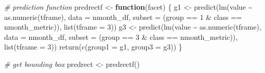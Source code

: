 \documentclass[
]{article}
\newenvironment{Shaded}{\begin{snugshade}}{\end{snugshade}}
\newcommand{\AttributeTok}[1]{\textcolor[rgb]{0.77,0.63,0.00}{#1}}
\newcommand{\CommentTok}[1]{\textcolor[rgb]{0.56,0.35,0.01}{\textit{#1}}}
\newcommand{\ControlFlowTok}[1]{\textcolor[rgb]{0.13,0.29,0.53}{\textbf{#1}}}
\newcommand{\DecValTok}[1]{\textcolor[rgb]{0.00,0.00,0.81}{#1}}
\newcommand{\FunctionTok}[1]{\textcolor[rgb]{0.00,0.00,0.00}{#1}}
\newcommand{\NormalTok}[1]{#1}
\newcommand{\OtherTok}[1]{\textcolor[rgb]{0.56,0.35,0.01}{#1}}
\newcommand{\SpecialCharTok}[1]{\textcolor[rgb]{0.00,0.00,0.00}{#1}}
\begin{document}
\begin{Shaded}
\begin{Highlighting}[]
\CommentTok{\# prediction function}
\NormalTok{predrectf }\OtherTok{\textless{}{-}} \ControlFlowTok{function}\NormalTok{(facet) \{}
\NormalTok{  g1 }\OtherTok{\textless{}{-}} \FunctionTok{predict}\NormalTok{(}\FunctionTok{lm}\NormalTok{(value }\SpecialCharTok{\textasciitilde{}} \FunctionTok{as.numeric}\NormalTok{(tframe), }\AttributeTok{data =}\NormalTok{ nmonth\_df, }\AttributeTok{subset =}\NormalTok{ (group }\SpecialCharTok{==} \DecValTok{1} \SpecialCharTok{\&}\NormalTok{ class }\SpecialCharTok{==}\NormalTok{ nmonth\_metric)), }\FunctionTok{list}\NormalTok{(}\AttributeTok{tframe =} \DecValTok{3}\NormalTok{))}
\NormalTok{  g3 }\OtherTok{\textless{}{-}} \FunctionTok{predict}\NormalTok{(}\FunctionTok{lm}\NormalTok{(value }\SpecialCharTok{\textasciitilde{}} \FunctionTok{as.numeric}\NormalTok{(tframe), }\AttributeTok{data =}\NormalTok{ nmonth\_df, }\AttributeTok{subset =}\NormalTok{ (group }\SpecialCharTok{==} \DecValTok{3} \SpecialCharTok{\&}\NormalTok{ class }\SpecialCharTok{==}\NormalTok{ nmonth\_metric)), }\FunctionTok{list}\NormalTok{(}\AttributeTok{tframe =} \DecValTok{3}\NormalTok{))}
  \FunctionTok{return}\NormalTok{(}\FunctionTok{c}\NormalTok{(}\AttributeTok{group1 =}\NormalTok{ g1, }\AttributeTok{group3 =}\NormalTok{ g3))}
\NormalTok{\}}

\CommentTok{\# get bounding box}
\NormalTok{predrect }\OtherTok{\textless{}{-}} \FunctionTok{predrectf}\NormalTok{()}


\end{Highlighting}
\end{Shaded}
\end{document}
